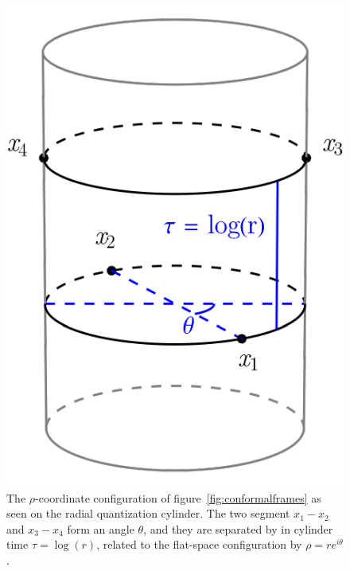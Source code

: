 \documentclass[a4paper,12pt]{article}
\numberwithin{equation}{section}
\begin{document}
\begin{figure}
	\centering
	\includegraphics[width=0.4\linewidth]{figures/rho-cylinder.pdf}
	\caption{The $\rho$-coordinate configuration
	of figure~\ref{fig:conformalframes} as seen on
	the radial quantization cylinder. 
	The two segment $x_1 - x_2$ and $x_3 - x_4$ form an angle $\theta$,
	and they are separated by in cylinder time $\tau = \log(r)$,
	related to the flat-space configuration by $\rho = r e^{i\theta}$.}
	\label{fig:rho}
\end{figure}
\end{document}
